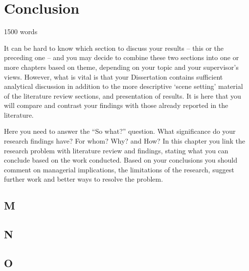 \chapter{Conclusion}\label{ch:conclusion}

1500 words

It can be hard to know which section to discuss your results – this or the preceding one – and you may decide to combine
these two sections into one or more chapters based on theme, depending on your topic and your supervisor’s views.
However, what is vital is that your Dissertation contains sufficient analytical discussion in addition to the more descriptive ‘scene setting’
material of the literature review sections, and presentation of results.
It is here that you will compare and contrast your findings with those already reported in the literature.

Here you need to answer the “So what?” question.
What significance do your research findings have?
For whom?
Why?
and How?
In this chapter you link the research problem with literature review and findings, stating what you can conclude based on the work conducted.
Based on your conclusions you should comment on managerial implications, the limitations of the research, suggest further work and better ways to resolve the problem.

\section{M}\label{sec:M}


\section{N}\label{sec:N}


\section{O}\label{sec:O}
